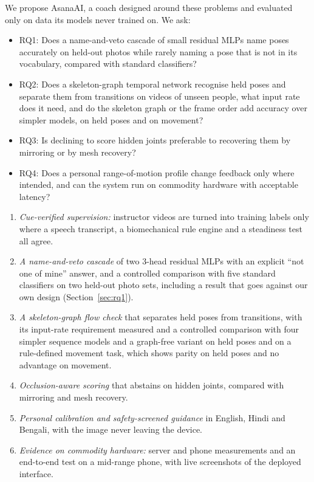  We propose AsanaAI, a coach designed around these problems and evaluated only on data its models never trained on. We ask:
\begin{itemize}\setlength{\itemsep}{1pt}\setlength{\topsep}{2pt}
\item RQ1: Does a name-and-veto cascade of small residual MLPs name poses accurately on held-out photos while rarely naming a pose that is not in its vocabulary, compared with standard classifiers?
\item RQ2: Does a skeleton-graph temporal network recognise held poses and separate them from transitions on videos of unseen people, what input rate does it need, and do the skeleton graph or the frame order add accuracy over simpler models, on held poses and on movement?
\item RQ3: Is declining to score hidden joints preferable to recovering them by mirroring or by mesh recovery?
\item RQ4: Does a personal range-of-motion profile change feedback only where intended, and can the system run on commodity hardware with acceptable latency?
\end{itemize}

\begin{enumerate}
\item \emph{Cue-verified supervision:} instructor videos are turned into training labels only where a speech transcript, a biomechanical rule engine and a steadiness test all agree.
\item \emph{A name-and-veto cascade} of two 3-head residual MLPs with an explicit ``not one of mine'' answer, and a controlled comparison with five standard classifiers on two held-out photo sets, including a result that goes against our own design (Section~\ref{sec:rq1}).
\item \emph{A skeleton-graph flow check} that separates held poses from transitions, with its input-rate requirement measured and a controlled comparison with four simpler sequence models and a graph-free variant on held poses and on a rule-defined movement task, which shows parity on held poses and no advantage on movement.
\item \emph{Occlusion-aware scoring} that abstains on hidden joints, compared with mirroring and mesh recovery.
\item \emph{Personal calibration and safety-screened guidance} in English, Hindi and Bengali, with the image never leaving the device.
\item \emph{Evidence on commodity hardware:} server and phone measurements and an end-to-end test on a mid-range phone, with live screenshots of the deployed interface.
\end{enumerate}
